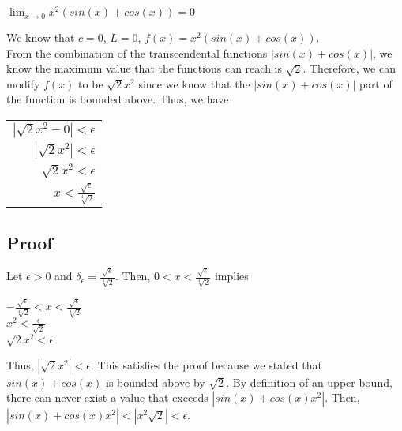 \documentclass{article}
\newcommand\abs[1]{\left|#1\right|}
\begin{document}
\vspace{.75cm}

\begin{flushleft}
\begin{center}
$\displaystyle \lim_{x \to 0} x^2(sin(x) + cos(x)) = 0$
\end{center}
\vspace{.4cm}
We know that $c=0$, $L=0$, $f(x) = x^2(sin(x) + cos(x))$. \\
\vspace{.4cm}
From the combination of the transcendental functions $\abs{sin(x) + cos(x)}$, we know the maximum value that the functions can reach is $\sqrt{2}$. Therefore, we can modify $f(x)$ to be $\sqrt{2} x^2$ since we know that the $\abs{sin(x) + cos(x)}$ part of the function is bounded above. Thus, we have
\begin{center}
\begin{tabular}{r}
$\abs{\sqrt{2} x^2 - 0} < \epsilon$ \\
$\abs{\sqrt{2} x^2} < \epsilon$ \\
$\sqrt{2} x^2 < \epsilon$ \\
$x < \frac{\sqrt{\epsilon}}{\sqrt[4]{2}}$ \\
\end{tabular}
\end{center}

\subsection*{Proof}

Let $\epsilon > 0$ and $\delta_\epsilon=\frac{\sqrt{\epsilon}}{\sqrt[4]{2}}$. Then, $0 < x < \frac{\sqrt{\epsilon}}{\sqrt[4]{2}}$ implies
\begin{center}
$-\frac{\sqrt{\epsilon}}{\sqrt[4]{2}} < x < \frac{\sqrt{\epsilon}}{\sqrt[4]{2}}$ \\
$x^2 < \frac{\epsilon}{\sqrt{2}}$ \\
$\sqrt{2}x^2 < \epsilon$ \\
\end{center}
Thus, $\abs{\sqrt{2}x^2} < \epsilon$. This satisfies the proof because we stated that $sin(x) + cos(x)$ is bounded above by $\sqrt{2}$. By definition of an upper bound, there can never exist a value that exceeds $\abs{sin(x) + cos(x)x^2}$. Then, $\abs{sin(x) + cos(x)x^2} < \abs{x^2\sqrt{2}} < \epsilon$.  
\end{flushleft}

\end{document}
